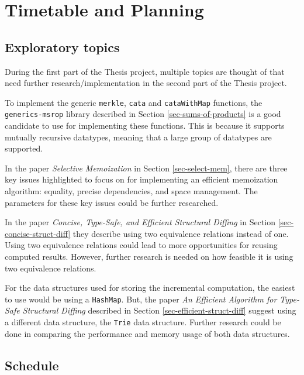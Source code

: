 \section{Timetable and Planning}
\subsection{Exploratory topics}
During the first part of the Thesis project, multiple topics are thought of that need further research/implementation in the second part of the Thesis project.

To implement the generic \texttt{merkle}, \texttt{cata} and \texttt{cataWithMap} functions, the \texttt{generics-msrop} library described in Section \ref{sec-sums-of-products} is a good candidate to use for implementing these functions. This is because it supports mutually recursive datatypes, meaning that a large group of datatypes are supported. 

In the paper \textit{Selective Memoization} in Section \ref{sec-select-mem}, there are three key issues highlighted to focus on for implementing an efficient memoization algorithm: equality, precise dependencies, and space management. The parameters for these key issues could be further researched.

In the paper \textit{Concise, Type-Safe, and Efficient Structural Diffing} in Section \ref{sec-concise-struct-diff} they describe using two equivalence relations instead of one. Using two equivalence relations could lead to more opportunities for reusing computed results. However, further research is needed on how feasible it is using two equivalence relations. 

For the data structures used for storing the incremental computation, the easiest to use would be using a \texttt{HashMap}. But, the paper \textit{An Efficient Algorithm for Type-Safe Structural Diffing} described in Section \ref{sec-efficient-struct-diff} suggest using a different data structure, the \texttt{Trie} data structure. Further research could be done in comparing the performance and memory usage of both data structures.


\newpage
\subsection{Schedule}

